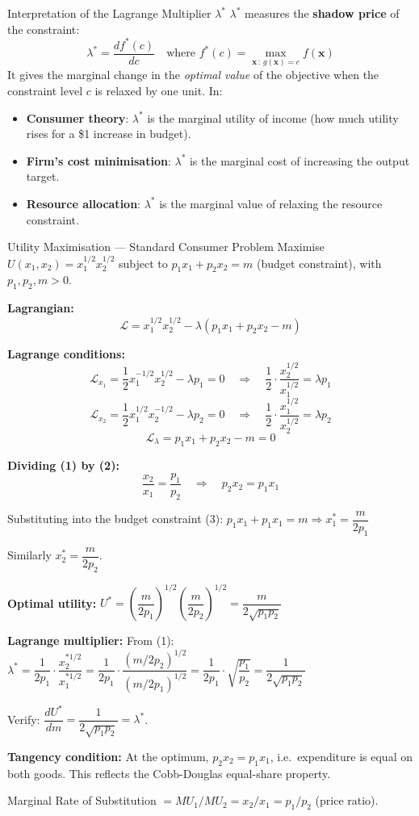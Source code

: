\documentclass[12pt, a4paper]{article}
\theoremstyle{definition}
\newcommand{\bx}{\mathbf{x}}
\newcommand{\ddd}[2]{\dfrac{d#1}{d#2}}
\begin{document}
\begin{keybox}{Interpretation of the Lagrange Multiplier $\lambda^*$}
$\lambda^*$ measures the \textbf{shadow price} of the constraint:
\[
  \lambda^* = \ddd{f^*(c)}{c}
  \quad\text{where } f^*(c) = \max_{\bx\,:\,g(\bx)=c} f(\bx)
\]
It gives the marginal change in the \emph{optimal value} of the objective
when the constraint level $c$ is relaxed by one unit. In:
\begin{itemize}
  \item \textbf{Consumer theory}: $\lambda^*$ is the marginal utility of
        income (how much utility rises for a \$1 increase in budget).
  \item \textbf{Firm's cost minimisation}: $\lambda^*$ is the marginal
        cost of increasing the output target.
  \item \textbf{Resource allocation}: $\lambda^*$ is the marginal value
        of relaxing the resource constraint.
\end{itemize}
\end{keybox}
\newpage
\begin{exbox}{Utility Maximisation --- Standard Consumer Problem}
Maximise $U(x_1, x_2) = x_1^{1/2} x_2^{1/2}$ subject to
$p_1 x_1 + p_2 x_2 = m$ (budget constraint), with $p_1, p_2, m > 0$.

\textbf{Lagrangian:}
\[
  \mathcal{L} = x_1^{1/2}x_2^{1/2} - \lambda(p_1 x_1 + p_2 x_2 - m)
\]

\textbf{Lagrange conditions:}
\[
  \mathcal{L}_{x_1} = \frac{1}{2}x_1^{-1/2}x_2^{1/2} - \lambda p_1 = 0
  \quad\Rightarrow\quad
  \frac{1}{2}\cdot\frac{x_2^{1/2}}{x_1^{1/2}} = \lambda p_1 \tag{1}
\]
\[
  \mathcal{L}_{x_2} = \frac{1}{2}x_1^{1/2}x_2^{-1/2} - \lambda p_2 = 0
  \quad\Rightarrow\quad
  \frac{1}{2}\cdot\frac{x_1^{1/2}}{x_2^{1/2}} = \lambda p_2 \tag{2}
\]
\[
  \mathcal{L}_\lambda = p_1 x_1 + p_2 x_2 - m = 0 \tag{3}
\]

\textbf{Dividing (1) by (2):}
\[
  \frac{x_2}{x_1} = \frac{p_1}{p_2}
  \quad\Rightarrow\quad
  p_2 x_2 = p_1 x_1
\]

Substituting into the budget constraint (3):
$p_1 x_1 + p_1 x_1 = m \Rightarrow x_1^* = \dfrac{m}{2p_1}$

Similarly $x_2^* = \dfrac{m}{2p_2}$.

\textbf{Optimal utility:}
$U^* = \left(\dfrac{m}{2p_1}\right)^{1/2}\!\left(\dfrac{m}{2p_2}\right)^{1/2}
= \dfrac{m}{2\sqrt{p_1 p_2}}$

\textbf{Lagrange multiplier:}
From (1): $\lambda^* = \dfrac{1}{2p_1}\cdot\dfrac{x_2^{*1/2}}{x_1^{*1/2}}
= \dfrac{1}{2p_1}\cdot\dfrac{(m/2p_2)^{1/2}}{(m/2p_1)^{1/2}}
= \dfrac{1}{2p_1}\cdot\sqrt{\dfrac{p_1}{p_2}}
= \dfrac{1}{2\sqrt{p_1 p_2}}$

Verify: $\ddd{U^*}{m} = \dfrac{1}{2\sqrt{p_1 p_2}} = \lambda^*$. \checkmark

\textbf{Tangency condition:}
At the optimum, $p_2 x_2 = p_1 x_1$, i.e.\ expenditure is equal on both
goods. This reflects the Cobb-Douglas equal-share property.

Marginal Rate of Substitution $= MU_1/MU_2 = x_2/x_1 = p_1/p_2$ (price ratio). \checkmark
\end{exbox}
\end{document}
